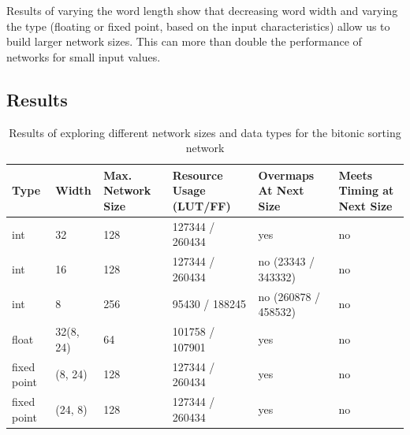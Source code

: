 Results of varying the word length show that decreasing word width and
varying the type (floating or fixed point, based on the input
characteristics) allow us to build larger network sizes. This can more
than double the performance of networks for small input values.

\subsection{Results}

\begin{table}[!ht]
  \begin{tabularx}{\textwidth}{X | X | X | X | X | X}
    \hline
    Type & Width & Max. Network Size & Resource Usage (LUT/FF) & Overmaps At Next Size & Meets Timing at Next Size \\
    \hline
    \hline
    int & 32 & 128 & 127344 / 260434 & yes & no \\
    \hline
    int & 16 & 128 & 127344 / 260434 & no (23343 / 343332) & no \\
    \hline
    int & 8 & 256 & 95430 / 188245 & no (260878 / 458532) & no \\
    \hline
    float & 32(8, 24) & 64 & 101758 / 107901 & yes & no \\
    \hline
    fixed point & (8, 24) & 128 & 127344 / 260434 & yes & no \\
    \hline
    fixed point & (24, 8) & 128 & 127344 / 260434 & yes & no \\
  \end{tabularx}
  \caption{Results of exploring different network sizes and data types for the bitonic sorting network}
\end{table}

